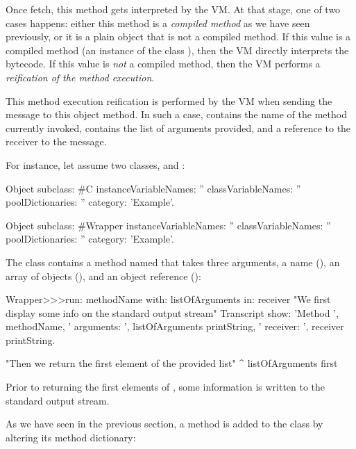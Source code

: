 \documentclass[a4paper,10pt,twoside]{book}
\begin{document}
Once fetch, this method gets interpreted by the VM. At that stage, one of two cases happens: either this method is a \emph{compiled method} as we have seen previously, or it is a plain object that is not a compiled method. If this value is a compiled method (an instance of the class ), then the VM directly interprets the bytecode. If this value is \emph{not} a compiled method, then the VM performs a \emph{reification of the method execution}.

This method execution reification is performed by the VM when sending the message  to this object method. In such a case,  contains the name of the method currently invoked,  contains the list of arguments provided, and  a reference to the receiver to the message.

For instance, let assume two classes,  and :

\begin{code}{}
Object subclass: #C
	instanceVariableNames: ''
	classVariableNames: ''
	poolDictionaries: ''
	category: 'Example'.
 
Object subclass: #Wrapper
	instanceVariableNames: ''
	classVariableNames: ''
	poolDictionaries: ''
	category: 'Example'.
\end{code}

The class  contains a method named  that takes three arguments, a name (), an array of objects (), and an object reference ():

\begin{code}{}
Wrapper>>>run: methodName with: listOfArguments in: receiver
	"We first display some info on the standard output stream"
	Transcript show: 'Method ', methodName,
		' arguments: ', listOfArguments printString,
		' receiver: ', receiver printString.

	"Then we return the first element of the provided list"
	^ listOfArguments first
\end{code}

Prior to returning the first elements of , some information is written to the standard output stream.

As we have seen in the previous section, a method  is added to the class  by altering its method dictionary:
\end{document}
